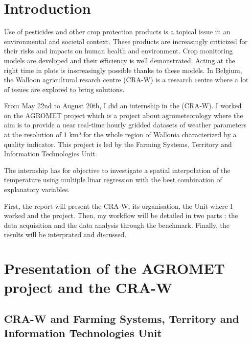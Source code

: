 \documentclass[12pt,twoside]{reedthesis}
\theoremstyle{definition}
\theoremstyle{definition}
\theoremstyle{definition}
\theoremstyle{remark}
\begin{document}
\mainmatter %
\pagestyle{fancyplain} %

\chapter*{Introduction}\label{introduction}

Use of pesticides and other crop protection products is a topical issue
in an environmental and societal context. These products are
increasingly criticized for their risks and impacts on human health and
environment. Crop monitoring models are developed and their efficiency
is well demonstrated. Acting at the right time in plots is inscreasingly
possible thanks to these models. In Belgium, the Walloon agricultural
resarch centre (CRA-W) is a research centre where a lot of issues are
explored to bring solutions.

From May 22nd to August 20th, I did an internship in the (CRA-W). I
worked on the AGROMET project which is a project about agrometeorology
where the aim is to provide a near real-time hourly gridded datasets of
weather parameters at the resolution of 1 km² for the whole region of
Wallonia characterized by a quality indicator. This project is led by
the Farming Systems, Territory and Information Technologies Unit.

The internship has for objective to investigate a spatial interpolation
of the temperature using multiple linar regression with the best
combination of explanatory variables.

First, the report will present the CRA-W, its organisation, the Unit
where I worked and the project. Then, my workflow will be detailed in
two parts : the data acquisition and the data analysis through the
benchmark. Finally, the results will be interprated and discussed.

\chapter{Presentation of the AGROMET project and the
CRA-W}\label{presentation}

\section{CRA-W and Farming Systems, Territory and Information
Technologies
Unit}\label{cra-w-and-farming-systems-territory-and-information-technologies-unit}
\end{document}
